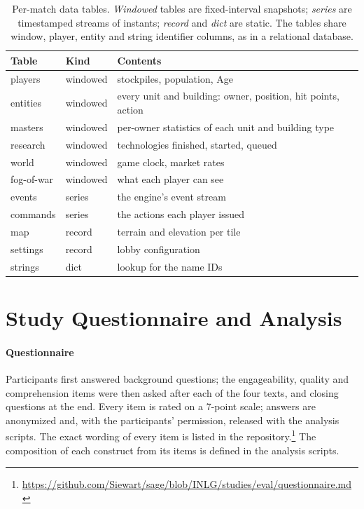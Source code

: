 \documentclass[11pt]{article}
\begin{document}
\begin{table}[h]
  \centering\footnotesize
  \setlength{\tabcolsep}{3pt}
  \begin{tabular}{@{}llp{3.5cm}@{}}
    \toprule
    \textbf{Table} & \textbf{Kind} & \textbf{Contents} \\
    \midrule
    players        & windowed      & stockpiles, population, Age \\
    entities       & windowed      & every unit and building: owner, position, hit points, action \\
    masters        & windowed      & per-owner statistics of each unit and building type \\
    research       & windowed      & technologies finished, started, queued \\
    world          & windowed      & game clock, market rates \\
    fog-of-war     & windowed      & what each player can see \\
    events         & series        & the engine's event stream \\
    commands       & series        & the actions each player issued \\
    map            & record        & terrain and elevation per tile \\
    settings       & record        & lobby configuration \\
    strings        & dict          & lookup for the name IDs \\
    \bottomrule
  \end{tabular}
  \caption{Per-match data tables. \emph{Windowed} tables are fixed-interval snapshots; \emph{series} are timestamped streams of instants; \emph{record} and \emph{dict} are static. The tables share window, player, entity and string identifier columns, as in a relational database.}
  \label{tab:schema}
\end{table}

\section{Study Questionnaire and Analysis}
\label{app:instrument}

\paragraph{Questionnaire}
Participants first answered background questions; the engageability, quality and comprehension items were then asked after each of the four texts, and closing questions at the end. Every item is rated on a 7-point scale; answers are anonymized and, with the participants' permission, released with the analysis scripts. The exact wording of every item is listed in the repository.\footnote{\url{https://github.com/Siewart/sage/blob/INLG/studies/eval/questionnaire.md}} The composition of each construct from its items is defined in the analysis scripts.
\end{document}

